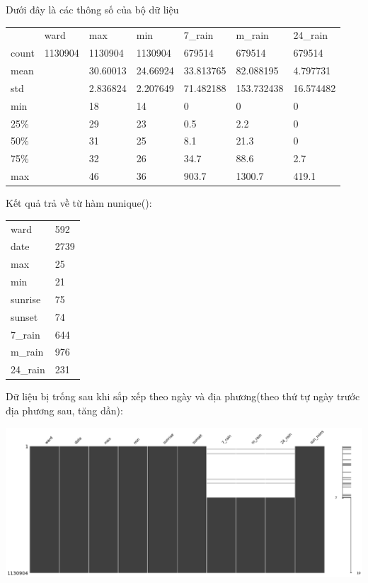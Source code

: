 \documentclass{article}
\begin{document}
Dưới đây là các thông số của bộ dữ liệu

\begin{table}[H]
	\begin{tabular}{lllllll}
		      & ward    & max      & min      & 7\_rain   & m\_rain    & 24\_rain  \\
		count & 1130904 & 1130904  & 1130904  & 679514    & 679514     & 679514    \\
		mean  &         & 30.60013 & 24.66924 & 33.813765 & 82.088195  & 4.797731  \\
		std   &         & 2.836824 & 2.207649 & 71.482188 & 153.732438 & 16.574482 \\
		min   &         & 18       & 14       & 0         & 0          & 0         \\
		25\%  &         & 29       & 23       & 0.5       & 2.2        & 0         \\
		50\%  &         & 31       & 25       & 8.1       & 21.3       & 0         \\
		75\%  &         & 32       & 26       & 34.7      & 88.6       & 2.7       \\
		max   &         & 46       & 36       & 903.7     & 1300.7     & 419.1
	\end{tabular}
\end{table}

Kết quả trả về từ hàm nunique():

\begin{table}[H]
	\begin{tabular}{ll}
		ward     & 592  \\
		date     & 2739 \\
		max      & 25   \\
		min      & 21   \\
		sunrise  & 75   \\
		sunset   & 74   \\
		7\_rain  & 644  \\
		m\_rain  & 976  \\
		24\_rain & 231  \\
	\end{tabular}
\end{table}

Dữ liệu bị trống sau khi sắp xếp theo ngày và địa phương(theo thứ tự ngày trước địa phương sau, tăng dần):

\includegraphics[width=6in]{images/missing.png}
\end{document}
